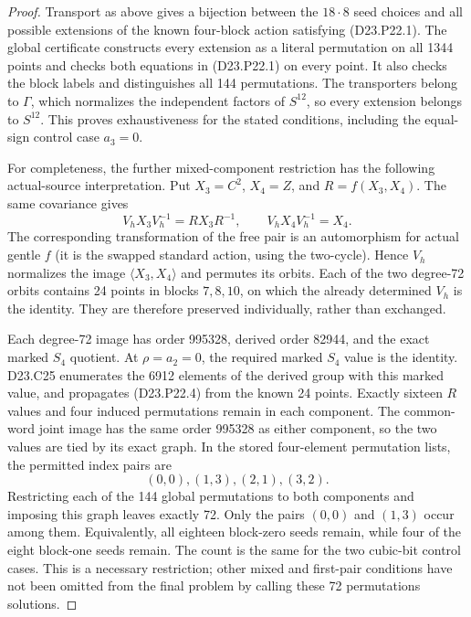 \begin{proof}
Transport as above gives a bijection between the $18\cdot8$
seed choices and all possible extensions of the known
four-block action satisfying (D23.P22.1). The global
certificate constructs every extension as a literal
permutation on all 1344 points and checks both equations
in (D23.P22.1) on every point. It also checks the block
labels and distinguishes all 144 permutations. The
transporters belong to $\Gamma$, which normalizes the
independent factors of $S^{12}$, so every extension belongs
to $S^{12}$. This proves exhaustiveness for the stated
conditions, including the equal-sign control case $a_3=0$.

For completeness, the further mixed-component restriction
has the following actual-source interpretation. Put
$X_3=C^2$, $X_4=Z$, and $R=f(X_3,X_4)$. The same
covariance gives
\[
     V_hX_3V_h^{-1}=RX_3R^{-1},\qquad
     V_hX_4V_h^{-1}=X_4.                                  \tag{D23.P22.4}
\]
The corresponding transformation of the free pair is an
automorphism for actual gentle $f$ (it is the swapped
standard action, using the two-cycle). Hence $V_h$
normalizes the image $\langle X_3,X_4\rangle$ and permutes
its orbits. Each of the two degree-72 orbits contains 24
points in blocks $7,8,10$, on which the already determined
$V_h$ is the identity. They are therefore preserved
individually, rather than exchanged.

Each degree-72 image has order 995328, derived order
82944, and the exact marked $S_4$ quotient. At
$\rho=a_2=0$, the required marked $S_4$ value is the
identity. D23.C25 enumerates the 6912 elements of the
derived group with this marked value, and propagates
(D23.P22.4) from the known 24 points. Exactly sixteen
$R$ values and four induced permutations remain in each
component. The common-word joint image has the same order
995328 as either component, so the two values are tied by
its exact graph. In the stored four-element permutation
lists, the permitted index pairs are
\[
                       (0,0),(1,3),(2,1),(3,2).
\]
Restricting each of the 144 global permutations to both
components and imposing this graph leaves exactly 72.
Only the pairs $(0,0)$ and $(1,3)$ occur among them.
Equivalently, all eighteen block-zero seeds remain, while
four of the eight block-one seeds remain. The count is
the same for the two cubic-bit control cases. This is a
necessary restriction; other mixed and first-pair conditions
have not been omitted from the final problem by calling
these 72 permutations solutions.
\end{proof}

